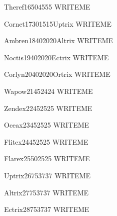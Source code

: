\documentclass[10pt,twocolumn]{memoir}
\begin{document}
\begin{grizzardpage}{Theref}{16}{50}{45}{55}{}
  WRITEME
\end{grizzardpage}

\begin{grizzardpage}{Cornet}{17}{30}{15}{15}{Uptrix}
  WRITEME
\end{grizzardpage}

\begin{grizzardpage}{Ambren}{18}{40}{20}{20}{Altrix}
  WRITEME
\end{grizzardpage}

\begin{grizzardpage}{Noctis}{19}{40}{20}{20}{Ectrix}
  WRITEME
\end{grizzardpage}

\begin{grizzardpage}{Corlyn}{20}{40}{20}{20}{Ortrix}
  WRITEME
\end{grizzardpage}

\begin{grizzardpage}{Wapow}{21}{45}{24}{24}{}
    WRITEME
  \end{grizzardpage}

  \begin{grizzardpage}{Zendex}{22}{45}{25}{25}{}
    WRITEME
  \end{grizzardpage}

  \begin{grizzardpage}{Oceax}{23}{45}{25}{25}{}
    WRITEME
  \end{grizzardpage}

  \begin{grizzardpage}{Flitex}{24}{45}{25}{25}{}
    WRITEME
  \end{grizzardpage}

  \begin{grizzardpage}{Flarex}{25}{50}{25}{25}{}
    WRITEME
  \end{grizzardpage}

  \begin{grizzardpage}{Uptrix}{26}{75}{37}{37}{}
    WRITEME
  \end{grizzardpage}

  \begin{grizzardpage}{Altrix}{27}{75}{37}{37}{}
    WRITEME
  \end{grizzardpage}

  \begin{grizzardpage}{Ectrix}{28}{75}{37}{37}{}
    WRITEME
  \end{grizzardpage}
\end{document}
